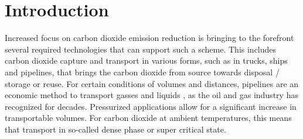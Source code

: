 \documentclass[a4paper, 10pt, twocolumn, twoside]{scrartcl}
\begin{document}
\maketitle
\noindent
\parbox{\columnwidth}{
\setlength{\fboxrule}{0.8pt}
\setlength{\fboxsep}{1.7mm}
{\color{SNE_GRAY}
}
\vspace{-1.55 mm}
}
\normalsize
{}
\fontsize{10.3pt}{1.15em}\selectfont
\section*{Introduction}
Increased focus on carbon dioxide emission reduction is bringing to the forefront several required technologies that can support such a scheme. This includes carbon dioxide capture \cite{andreasen_CC} and transport in various forms, such as in trucks, ships and pipelines, that brings the carbon dioxide from source towards disposal / storage or reuse. For certain conditions of volumes and distances, pipelines are an economic method to transport gasses and liquids \cite{Lu2020}, as the oil and gas industry has recognized for decades. Pressurized applications allow for a significant increase in transportable volumes. For carbon dioxide at ambient temperatures, this means that transport in so-called dense phase or super critical state. 
\end{document}
